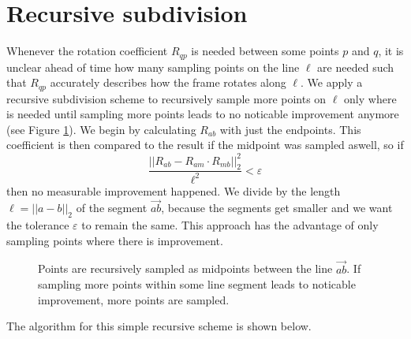 \documentclass[../thesis.tex]{subfiles}
\begin{document}
\section{Recursive subdivision}
Whenever the rotation coefficient $R_{qp}$ is needed between some points $p$ and $q$,
it is unclear ahead of time how many sampling points on the line $\ell$
are needed such that $R_{qp}$ accurately describes how the frame rotates along $\ell$.
We apply a recursive subdivision scheme to recursively sample more points on $\ell$ only where is needed
until sampling more points leads to no noticable improvement anymore (see Figure \ref{fig:recursiveSubdivision}).
We begin by calculating $R_{ab}$ with just the endpoints. This coefficient is then compared to the result if the midpoint was sampled aswell,
so if
$$\frac{||R_{ab} - R_{am}\cdot R_{mb}||^2_2}{\ell^2}< \varepsilon$$
then no measurable improvement happened. We divide by the length $\ell = ||a-b||_2$ of the segment $\vec{ab}$, because the segments get smaller
and we want the tolerance $\varepsilon$ to remain the same.
This approach has the advantage of only sampling points where there is improvement.
\begin{figure}[htb]
  \centering
  \def\svgwidth{20em}
  
  \caption{Points are recursively sampled as midpoints between the line $\vec{ab}$.
  If sampling more points within some line segment leads to noticable improvement, more points are sampled.}
  \label{fig:recursiveSubdivision}
\end{figure}
The algorithm for this simple recursive scheme is shown below.
\end{document}
